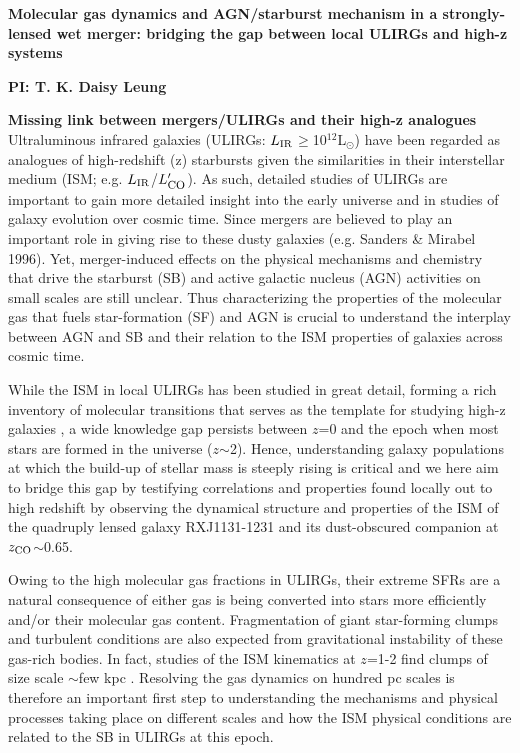 \documentclass[12pt,a4paper]{article}
\newcommand{\Lsun}{\mbox{L$_{\odot}$}\xspace}
\newcommand{\LIR}{\mbox{$L_{\rm IR}$}\xspace}
\newcommand{\Lp}[1][CO]{\mbox{$L^{\prime}_\textrm{\fontsize{8pt}{12pt}\selectfont{#1}}$}}
\begin{document}
\pagestyle{plain}
 
\begin{center}
{\large{\bf
{ 
Molecular gas dynamics and AGN/starburst mechanism in a
strongly-lensed wet merger: bridging the gap between local ULIRGs and high-z systems}
}}
\end{center}
\vspace{-0.545em}
\centerline{\normalsize{\bf PI: 
{T. K. Daisy Leung}}} 
\vspace{0.1em} {\bf Missing link between mergers/ULIRGs and their high-z analogues} 
Ultraluminous infrared galaxies (ULIRGs: \LIR$\geq$10$^{12}$\Lsun) have been
regarded as analogues of high-redshift (z) starbursts given the
similarities in their interstellar medium (ISM; e.g. \LIR/\Lp).
As such, detailed studies 
of ULIRGs are important 
to gain more detailed insight into the early universe and in studies of galaxy evolution over cosmic time.
Since mergers are believed to play an important role in giving rise to these dusty galaxies
(e.g. Sanders \& Mirabel 1996). Yet, merger-induced effects on the physical mechanisms and chemistry 
that drive the 
starburst (SB) and active galactic nucleus (AGN) activities on small scales are still unclear.
Thus characterizing the properties of the molecular gas that fuels star-formation (SF) and AGN is
crucial to understand the interplay between AGN and SB
and their relation to the ISM properties of galaxies across cosmic time.

While the ISM in local ULIRGs has been studied in great detail,
forming a rich inventory of molecular transitions that serves as the template for 
studying high-z galaxies 
\citep[e.g.][]{Rangwala15a}, a wide knowledge gap persists
between $z$=0 and the epoch when most stars are formed in the universe ($z$$\sim$2). 
Hence, understanding galaxy populations at which
the build-up of stellar mass 
is steeply rising is critical and we here aim to bridge this gap by testifying
correlations and properties found locally out to high redshift by observing the 
dynamical structure and properties of the ISM of
the quadruply lensed galaxy RXJ1131-1231 and its dust-obscured 
companion at $z_{\rm CO}$$\sim$0.65.

Owing to the high molecular gas fractions in ULIRGs,
their extreme SFRs are a natural consequence of either gas is being converted into stars
more efficiently and/or their molecular gas content. Fragmentation
of giant star-forming clumps and turbulent conditions are also expected 
from gravitational instability of these gas-rich bodies. 
In fact, studies of the ISM kinematics at $z$=1-2 find clumps of size scale
 $\sim$few kpc \citep{Swinbank12a, Swinbank12b}. 
Resolving the gas dynamics on hundred pc scales is therefore an important first step
to understanding the mechanisms and physical processes taking
place on different scales and how the ISM physical conditions 
are related to the SB in ULIRGs at this epoch. %
\end{document}
